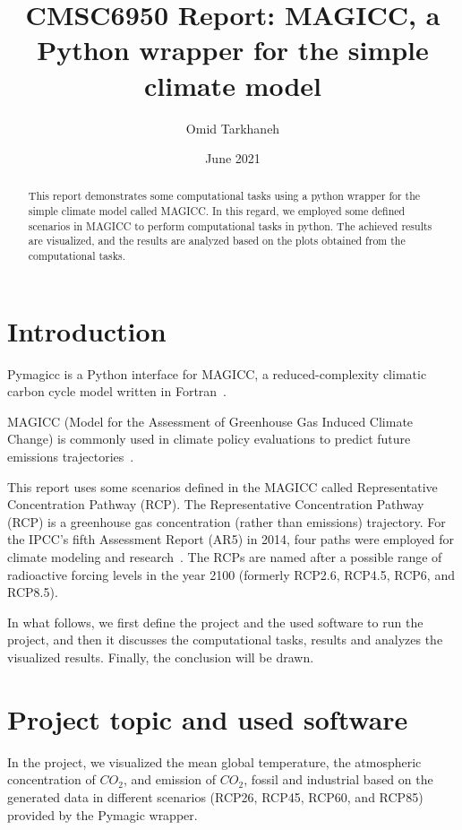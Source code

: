 \documentclass[12pt]{article}
\title{CMSC6950 Report: MAGICC, a Python wrapper for the simple climate model  }
\date{June 2021}
\author{Omid Tarkhaneh}
\begin{document}
\maketitle


\begin{abstract}
This report demonstrates some computational tasks using a python wrapper for the simple climate model called MAGICC. In this regard, we employed some defined scenarios in MAGICC to perform computational tasks in python. The achieved results are visualized, and the results are analyzed based on the plots obtained from the computational tasks.
\end{abstract}


\section{Introduction} 
\label{sec:intro}
Pymagicc is a Python interface for MAGICC, a reduced-complexity climatic carbon cycle model written in Fortran~\cite{meinshausen2011emulating, Gieseke2018}.

MAGICC (Model for the Assessment of Greenhouse Gas Induced Climate Change) is commonly used in climate policy evaluations to predict future emissions trajectories~\cite{Gieseke2018}.

This report uses some scenarios defined in the MAGICC called Representative Concentration Pathway (RCP).
The Representative Concentration Pathway (RCP) is a greenhouse gas concentration (rather than emissions) trajectory. For the IPCC's fifth Assessment Report (AR5) in 2014, four paths were employed for climate modeling and research~\cite{moss2008towards}. The RCPs are named after a possible range of radioactive forcing levels in the year 2100 (formerly RCP2.6, RCP4.5, RCP6, and RCP8.5).

In what follows, we first define the project and the used software to run the project, and then it discusses the computational tasks, results and analyzes the visualized results. Finally, the conclusion will be drawn.


\section{Project topic and used software}

In the project, we visualized the mean global temperature, the atmospheric concentration of $CO_2$, and emission of $CO_2$, fossil and industrial based on the generated data in different scenarios (RCP26, RCP45, RCP60, and RCP85) provided by the Pymagic wrapper.
\end{document}
